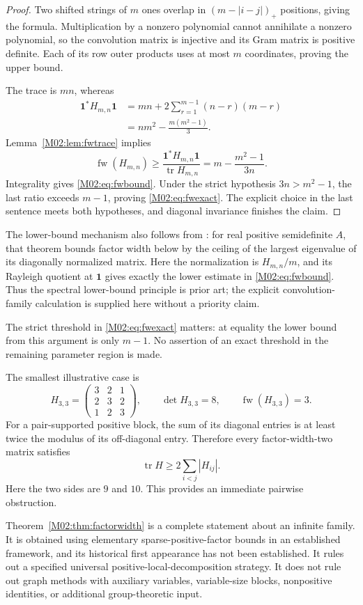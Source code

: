 \documentclass[11pt,a4paper,oneside]{report}
\theoremstyle{definition}
\theoremstyle{remark}
\DeclareMathOperator{\tr}{tr}
\DeclareMathOperator{\FW}{fw}
\newcommand{\one}{\mathbf 1}
\begin{document}
\begin{proof}
Two shifted strings of \(m\) ones overlap in \((m-|i-j|)_+\) positions, giving the formula. Multiplication by a nonzero polynomial cannot annihilate a nonzero polynomial, so the convolution matrix is injective and its Gram matrix is positive definite. Each of its row outer products uses at most \(m\) coordinates, proving the upper bound.

The trace is \(mn\), whereas
\begin{align*}
\one^*H_{m,n}\one
&=mn+2\sum_{r=1}^{m-1}(n-r)(m-r)\\
&=nm^2-\frac{m(m^2-1)}3.
\end{align*}
Lemma~\ref{M02:lem:fwtrace} implies
\[
\FW(H_{m,n})\ge
\frac{\one^*H_{m,n}\one}{\tr H_{m,n}}
=m-\frac{m^2-1}{3n}.
\]
Integrality gives \eqref{M02:eq:fwbound}. Under the strict hypothesis \(3n>m^2-1\), the last ratio exceeds \(m-1\), proving \eqref{M02:eq:fwexact}. The explicit choice in the last sentence meets both hypotheses, and diagonal invariance finishes the claim.
\end{proof}
The lower-bound mechanism also follows from \cite[Theorem 12]{B:BCPT}: for real positive semidefinite \(A\), that theorem bounds factor width below by the ceiling of the largest eigenvalue of its diagonally normalized matrix. Here the normalization is \(H_{m,n}/m\), and its Rayleigh quotient at \(\one\) gives exactly the lower estimate in \eqref{M02:eq:fwbound}. Thus the spectral lower-bound principle is prior art; the explicit convolution-family calculation is supplied here without a priority claim.

The strict threshold in \eqref{M02:eq:fwexact} matters: at equality the lower bound from this argument is only \(m-1\). No assertion of an exact threshold in the remaining parameter region is made.

The smallest illustrative case is
\[
H_{3,3}=
\begin{pmatrix}3&2&1\\2&3&2\\1&2&3\end{pmatrix},
\qquad
\det H_{3,3}=8,\qquad \FW(H_{3,3})=3.
\]
For a pair-supported positive block, the sum of its diagonal entries is at least twice the modulus of its off-diagonal entry. Therefore every factor-width-two matrix satisfies
\[
\tr H\ge2\sum_{i<j}|H_{ij}|.
\]
Here the two sides are \(9\) and \(10\). This provides an immediate pairwise obstruction.

Theorem~\ref{M02:thm:factorwidth} is a complete statement about an infinite family. It is obtained using elementary sparse-positive-factor bounds in an established framework, and its historical first appearance has not been established. It rules out a specified universal positive-local-decomposition strategy. It does not rule out graph methods with auxiliary variables, variable-size blocks, nonpositive identities, or additional group-theoretic input.
\end{document}
